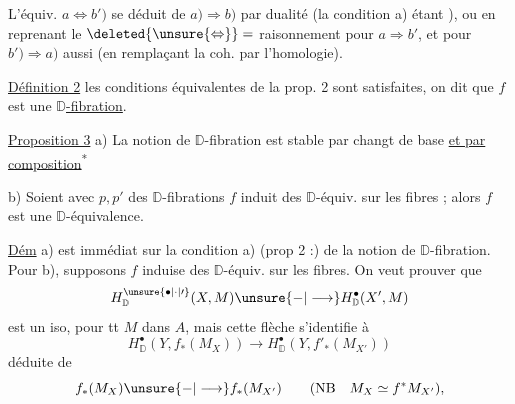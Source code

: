 
L'équiv. $a\Longleftrightarrow b')$  se déduit de $a)\Longrightarrow b)$ par dualité (la condition a) étant ), ou en reprenant le $\deleted{\unsure{\Leftrightarrow}}=$ raisonnement pour $a\Rightarrow b'$, et pour $b')\Rightarrow a)$ aussi (en  remplaçant la coh. par l'homologie).

\uline{Définition 2}   les conditions équivalentes de la prop. 2 sont satisfaites, on dit que $f$ est une \uline{$\mathbb D$-fibration}.


\uline{Proposition 3} a) La notion de $\mathbb D$-fibration est stable par changt de base \uline{et par composition}\textsuperscript{*}


b) Soient
avec $p,p'$ des $\mathbb D$-fibrations   $f$ induit des $\mathbb D$-équiv. sur les fibres ; alors $f$ est une $\mathbb D$-équivalence.


\uline{Dém} a) est immédiat sur la condition a) (prop 2 :) de la notion de $\mathbb D$-fibration. Pour b), supposons  $f$ induise des $\mathbb D$-équiv. sur les fibres. On veut prouver que
\[
H^{\unsure{\bullet|\cdot|\prime}}_{\mathbb D}(X,M)\unsure{-|\longrightarrow} H^\bullet_{\mathbb D}(X',M)
\]
est un iso, pour tt $M$ dans $A$, mais cette flèche s'identifie à
\[
H^\bullet_{\mathbb D}(Y,f_*(M_X))\longrightarrow H^\bullet_{\mathbb D}(Y,f'_*(M_{X'}))
\]
déduite de
\[
f_*(M_X)\unsure{-|\longrightarrow} f_*(M_{X'})\qquad(\mathrm{NB}\quad M_X\simeq f^*M_{X'}),
\]
